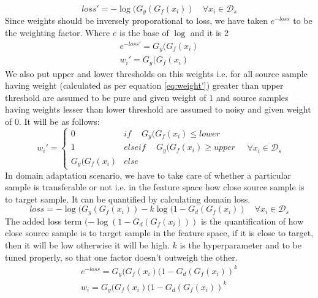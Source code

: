 \begin{equation*}
    loss' = -\log(G_y(G_f(x_i)) \quad \forall x_i \in \mathcal{D}_s
\end{equation*}
Since weights should be inversely proporational to loss, we have taken $e^{-loss}$ to be the weighting factor. Where $e$ is the base of $\log$ and it is $2$
\begin{equation}
\label{eq:weight'}
\begin{align}
    e^{-loss'} = G_y(G_f(x_i)\\
    w_{i}' =     G_y(G_f(x_i)
\end{align}
\end{equation}
We also put upper and lower thresholds on this weights i.e. for all source sample having weight (calculated as per equation \ref{eq:weight'}) greater than upper threshold are assumed to be pure and given weight of $1$ and source samples having weights lesser than lower threshold are assumed to noisy and given weight of $0$. It will be as follows:
\begin{equation*}
                w_{i}' = \begin{cases}
		            0 & if\ \quad G_y(G_f(x_i) \le lower \\
		            1 & elseif\ \quad G_y(G_f(x_i) \ge upper \\
		            G_y(G_f(x_i) & else\ 
		            \end{cases} \quad \forall x_i \in \mathcal{D}_s
\end{equation*}
In domain adaptation scenario, we have to take care of whether a particular sample is transferable or not i.e. in the feature space how close source sample is to target sample. It can be quantified by calculating domain loss.
\begin{equation}
    loss = -\log(G_y(G_f(x_i)) - k \log(1 - G_d(G_f(x_i)) \quad \forall x_i \in \mathcal{D}_s
\end{equation}
The added loss term $(-\log(1 - G_d(G_f(x_i)))$ is the quantification of how close source sample is to target sample in the feature space, if it is close to target, then it will be low otherwise it will be high. $k$ is the hyperparameter and to be tuned properly, so that one factor doesn't outweigh the other.
\begin{equation}
\begin{align}
    e^{-loss} = G_y(G_f(x_i)(1 - G_d(G_f(x_i))^k\\
    w_{i} =     G_y(G_f(x_i)(1 - G_d(G_f(x_i))^k
\end{align}
\end{equation}

